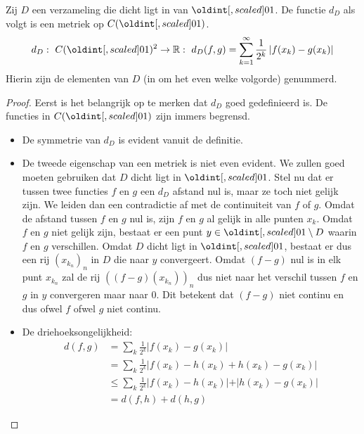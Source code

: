\documentclass[main.tex]{subfiles}
\begin{document}
\begin{vb}
  Zij $D$ een verzameling die dicht ligt in van $\interval{0}{1}$.
  De functie $d_{D}$ als volgt is een metriek op $C(\interval{0}{1})$.
  \[ d_{D}:\ C(\interval{0}{1})^{2} \rightarrow \mathbb{R}:\ d_{D}(f,g) = \sum_{k=1}^{\infty}\frac{1}{2^{k}}\left| f(x_{k}) - g(x_{k})\right| \]
  Hierin zijn de elementen van $D$ (in om het even welke volgorde) genummerd.
  
  \begin{proof}
    Eerst is het belangrijk op te merken dat $d_{D}$ goed gedefinieerd is.
    De functies in $C(\interval{0}{1})$ zijn immers begrensd.
    \begin{itemize}
    \item De symmetrie van $d_{D}$ is evident vanuit de definitie.
    \item De tweede eigenschap van een metriek is niet even evident.
      We zullen goed moeten gebruiken dat $D$ dicht ligt in $\interval{0}{1}$.
      Stel nu dat er tussen twee functies $f$ en $g$ een $d_{D}$ afstand nul is, maar ze toch niet gelijk zijn.
      We leiden dan een contradictie af met de continuiteit van $f$ of $g$.
      Omdat de afstand tussen $f$ en $g$ nul is, zijn $f$ en $g$ al gelijk in alle punten $x_{k}$.
      Omdat $f$ en $g$ niet gelijk zijn, bestaat er een punt $y\in \interval{0}{1} \setminus D$ waarin $f$ en $g$ verschillen.
      Omdat $D$ dicht ligt in $\interval{0}{1}$, bestaat er dus een rij $(x_{k_{n}})_{n}$ in $D$ die naar $y$ convergeert.
      Omdat $(f-g)$ nul is in elk punt $x_{k_{n}}$ zal de rij $((f-g)(x_{k_{n}}))_{n}$ dus niet naar het verschil tussen $f$ en $g$ in $y$ convergeren maar naar $0$.
      Dit betekent dat $(f-g)$ niet continu en dus ofwel $f$ ofwel $g$ niet continu.
    \item De driehoeksongelijkheid:
      \begin{align*}
        d(f,g)
        &= \sum_{k}\frac{1}{2^{k}}\left| f(x_{k}) - g(x_{k})\right|\\
        &= \sum_{k}\frac{1}{2^{k}}\left| f(x_{k}) - h(x_{k}) + h(x_{k}) - g(x_{k})\right|\\
        &\le \sum_{k}\frac{1}{2^{k}}\left| f(x_{k}) - h(x_{k})| + |h(x_{k}) - g(x_{k})\right|\\
        &= d(f,h) + d(h,g)
      \end{align*}
    \end{itemize}
  \end{proof}
\end{vb}
\end{document}
